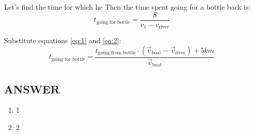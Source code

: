 Let's find the time for which he Then the time spent going for a bottle back is:
$$t_{\text{going for bottle}} = \frac{S}{v_1 - v_{\text{river}}}$$

Substitute equations \eqref{eq:1} and \eqref{eq:2}:
$$t_{\text{going for bottle}} = \frac{t_{\text{going from bottle}} \cdot (\Vec{v}_{\text{boat}} - \Vec{v}_{\text{river}}) + 5km}{\Vec{v}_{\text{boat}}}$$


\vfill
\subsection*{ANSWER}
\begin{enumerate}
    \item 1
    \item 2
\end{enumerate}

